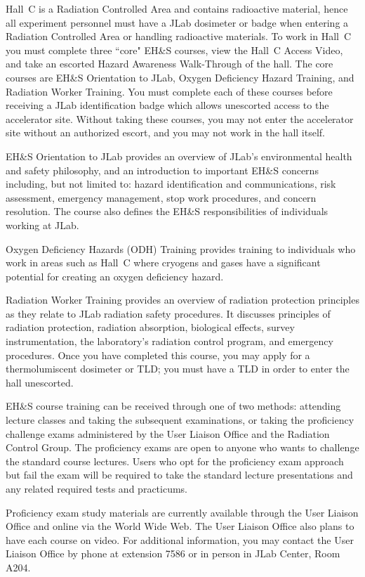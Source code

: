 Hall~C is a Radiation Controlled Area and contains radioactive material, hence all 
experiment personnel must have a JLab dosimeter or badge when entering a Radiation 
Controlled Area or handling radioactive materials.  
To work in Hall~C you must complete three ``core" EH\&S courses, view
the Hall~C
Access Video, and take an escorted Hazard Awareness Walk-Through of the
hall. The core
courses are EH\&S Orientation to JLab, Oxygen Deficiency Hazard
Training, and Radiation
Worker Training. You must complete each of these courses before receiving a
JLab
identification badge which allows unescorted access to the accelerator
site. Without taking these
courses, you may not enter the accelerator site without an authorized
escort, and you may not
work in the hall itself.

EH\&S Orientation to JLab provides an overview of JLab's
environmental health
and safety philosophy, and an introduction to important EH\&S concerns
including, but not
limited to: hazard identification and communications, risk assessment,
emergency management,
stop work procedures, and concern resolution. The course also defines the
EH\&S
responsibilities of individuals working at JLab.

Oxygen Deficiency Hazards (ODH) Training provides training to 
individuals who work
in areas such as Hall~C where cryogens and gases have a significant
potential for creating an
oxygen deficiency hazard.

Radiation Worker Training provides an overview of radiation protection
principles as
they relate to JLab radiation safety procedures. It discusses principles
of radiation protection,
radiation absorption, biological effects, survey instrumentation, the
laboratory's radiation control
program, and emergency procedures. Once you have completed this course, you 
may apply for
a thermolumiscent dosimeter or TLD; you must have a TLD in order to enter
the hall
unescorted.

EH\&S course training can be received through one of two methods:
attending lecture
classes and taking the subsequent examinations, or taking the proficiency
challenge exams
administered by the User Liaison Office and the Radiation Control Group.
The proficiency
exams are open to anyone who wants to challenge the standard course
lectures. Users who opt
for the proficiency exam approach but fail the exam will be required to
take the standard lecture
presentations and any related required tests and practicums.

Proficiency exam study materials are currently available through the 
User Liaison Office
and online via the World Wide Web. The User Liaison Office also plans to
have each course on
video. For additional information, you may contact the User Liaison Office
by phone at
extension 7586 or in person in JLab Center, Room A204.

